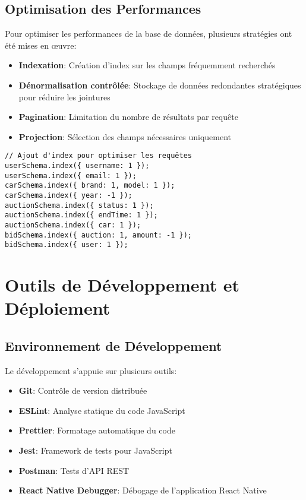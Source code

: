 \subsection{Optimisation des Performances}

Pour optimiser les performances de la base de données, plusieurs stratégies ont été mises en œuvre:

\begin{itemize}
    \item \textbf{Indexation}: Création d'index sur les champs fréquemment recherchés
    \item \textbf{Dénormalisation contrôlée}: Stockage de données redondantes stratégiques pour réduire les jointures
    \item \textbf{Pagination}: Limitation du nombre de résultats par requête
    \item \textbf{Projection}: Sélection des champs nécessaires uniquement
\end{itemize}

\begin{verbatim}
// Ajout d'index pour optimiser les requêtes
userSchema.index({ username: 1 });
userSchema.index({ email: 1 });
carSchema.index({ brand: 1, model: 1 });
carSchema.index({ year: -1 });
auctionSchema.index({ status: 1 });
auctionSchema.index({ endTime: 1 });
auctionSchema.index({ car: 1 });
bidSchema.index({ auction: 1, amount: -1 });
bidSchema.index({ user: 1 });
\end{verbatim}

\section{Outils de Développement et Déploiement}

\subsection{Environnement de Développement}

Le développement s'appuie sur plusieurs outils:

\begin{itemize}
    \item \textbf{Git}: Contrôle de version distribuée
    \item \textbf{ESLint}: Analyse statique du code JavaScript
    \item \textbf{Prettier}: Formatage automatique du code
    \item \textbf{Jest}: Framework de tests pour JavaScript
    \item \textbf{Postman}: Tests d'API REST
    \item \textbf{React Native Debugger}: Débogage de l'application React Native
\end{itemize}

